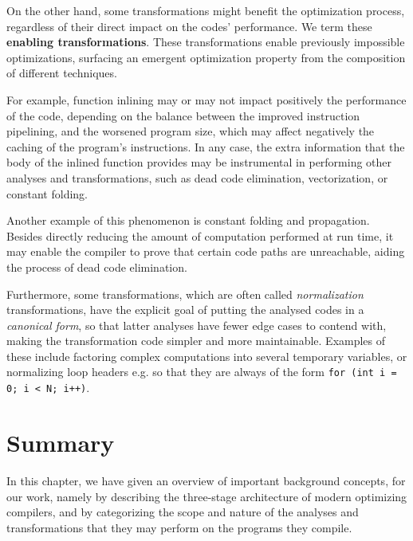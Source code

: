 On the other hand, some transformations might benefit the optimization process, regardless of their direct impact on the codes' performance. We term these \textbf{enabling transformations}. These transformations enable previously impossible optimizations, surfacing an emergent optimization property from the composition of different techniques\cite{Click1995}.

For example, function inlining may or may not impact positively the performance of the code\cite{Chen1993}, depending on the balance between the improved instruction pipelining, and the worsened program size, which may affect negatively the caching of the program's instructions. In any case, the extra information that the body of the inlined function provides may be instrumental in performing other analyses and transformations, such as dead code elimination, vectorization, or constant folding.

Another example of this phenomenon is constant folding and propagation. Besides directly reducing the amount of computation performed at run time, it may enable the compiler to prove that certain code paths are unreachable, aiding the process of dead code elimination.

Furthermore, some transformations, which are often called \textit{normalization} transformations, have the explicit goal of putting the analysed codes in a \textit{canonical form}, so that latter analyses have fewer edge cases to contend with, making the transformation code simpler and more maintainable. Examples of these include factoring complex computations into several temporary variables, or normalizing loop headers\cite{Gomes2021} e.g. so that they are always of the form \texttt{for (int i = 0; i < N; i++)}.

\section{Summary}

In this chapter, we have given an overview of important background concepts, for our work, namely by describing the three-stage architecture of modern optimizing compilers, and by categorizing the scope and nature of the analyses and transformations that they may perform on the programs they compile.